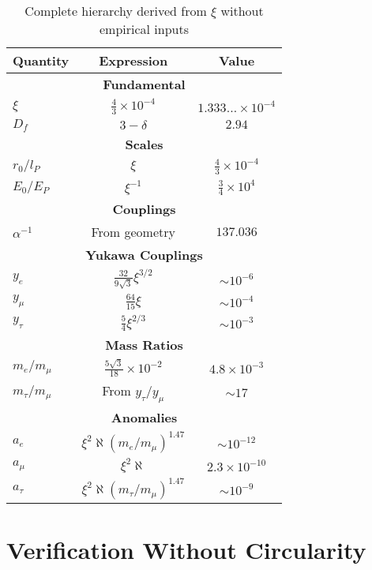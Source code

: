 \documentclass[12pt,a4paper]{article}
\newcommand{\lP}{l_P}
\newcommand{\EP}{E_P}
\newcommand{\rzero}{r_0}
\newcommand{\Ezero}{E_0}
\newcommand{\xipar}{\xi}
\begin{document}
\begin{table}[h]
	\centering
	\begin{tabular}{lcc}
		\toprule
		\textbf{Quantity} & \textbf{Expression} & \textbf{Value} \\
		\midrule
		\multicolumn{3}{c}{\textbf{Fundamental}} \\
		$\xipar$ & $\frac{4}{3} \times 10^{-4}$ & $1.333\ldots \times 10^{-4}$ \\
		$D_f$ & $3 - \delta$ & $2.94$ \\
		\midrule
		\multicolumn{3}{c}{\textbf{Scales}} \\
		$\rzero/\lP$ & $\xipar$ & $\frac{4}{3} \times 10^{-4}$ \\
		$\Ezero/\EP$ & $\xipar^{-1}$ & $\frac{3}{4} \times 10^{4}$ \\
		\midrule
		\multicolumn{3}{c}{\textbf{Couplings}} \\
		$\alpha^{-1}$ & From geometry & $137.036$ \\
		\midrule
		\multicolumn{3}{c}{\textbf{Yukawa Couplings}} \\
		$y_e$ & $\frac{32}{9\sqrt{3}} \xipar^{3/2}$ & $\sim 10^{-6}$ \\
		$y_\mu$ & $\frac{64}{15} \xipar$ & $\sim 10^{-4}$ \\
		$y_\tau$ & $\frac{5}{4} \xipar^{2/3}$ & $\sim 10^{-3}$ \\
		\midrule
		\multicolumn{3}{c}{\textbf{Mass Ratios}} \\
		$m_e/m_\mu$ & $\frac{5 \sqrt{3}}{18} \times 10^{-2}$ & $4.8 \times 10^{-3}$ \\
		$m_\tau/m_\mu$ & From $y_\tau/y_\mu$ & $\sim 17$ \\
		\midrule
		\multicolumn{3}{c}{\textbf{Anomalies}} \\
		$a_e$ & $\xipar^2 \aleph (m_e/m_\mu)^{1.47}$ & $\sim 10^{-12}$ \\
		$a_\mu$ & $\xipar^2 \aleph$ & $2.3 \times 10^{-10}$ \\
		$a_\tau$ & $\xipar^2 \aleph (m_\tau/m_\mu)^{1.47}$ & $\sim 10^{-9}$ \\
		\bottomrule
	\end{tabular}
	\caption{Complete hierarchy derived from $\xipar$ without empirical inputs}
\end{table}

\section{Verification Without Circularity}
\end{document}
